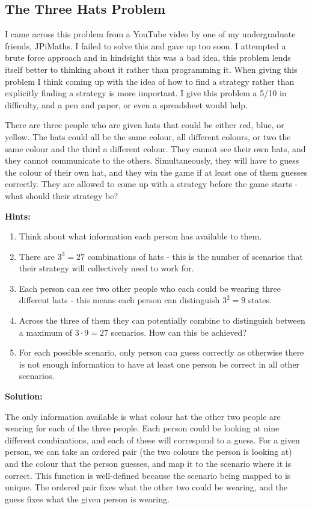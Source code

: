 \subsection{The Three Hats Problem}

I came across this problem from a YouTube video by one of my undergraduate friends, JPiMaths. I failed to solve this and gave up too soon. I attempted a brute force approach and in hindsight this was a bad idea, this problem lends itself better to thinking about it rather than programming it. When giving this problem I think coming up with the idea of how to find a strategy rather than explicitly finding a strategy is more important. I give this problem a 5/10 in difficulty, and a pen and paper, or even a spreadsheet would help.

There are three people who are given hats that could be either red, blue, or yellow. The hats could all be the same colour, all different colours, or two the same colour and the third a different colour. They cannot see their own hats, and they cannot communicate to the others. Simultaneously, they will have to guess the colour of their own hat, and they win the game if at least one of them guesses correctly. They are allowed to come up with a strategy before the game starts - what should their strategy be?

\textbf{Hints:}

\begin{enumerate}
	\item Think about what information each person has available to them.
	\item There are $3^3 = 27$ combinations of hats - this is the number of scenarios that their strategy will collectively need to work for.
	\item Each person can see two other people who each could be wearing three different hats - this means each person can distinguish $3^2 = 9$ states.
	\item Across the three of them they can potentially combine to distinguish between a maximum of $3 \cdot 9 = 27$ scenarios. How can this be achieved?
	\item For each possible scenario, only person can guess correctly as otherwise there is not enough information to have at least one person be correct in all other scenarios.
\end{enumerate}

\textbf{Solution:}

The only information available is what colour hat the other two people are wearing for each of the three people. Each person could be looking at nine different combinations, and each of these will correspond to a guess. For a given person, we can take an ordered pair (the two colours the person is looking at) and the colour that the person guesses, and map it to the scenario where it is correct. This function is well-defined because the scenario being mapped to is unique. The ordered pair fixes what the other two could be wearing, and the guess fixes what the given person is wearing.

